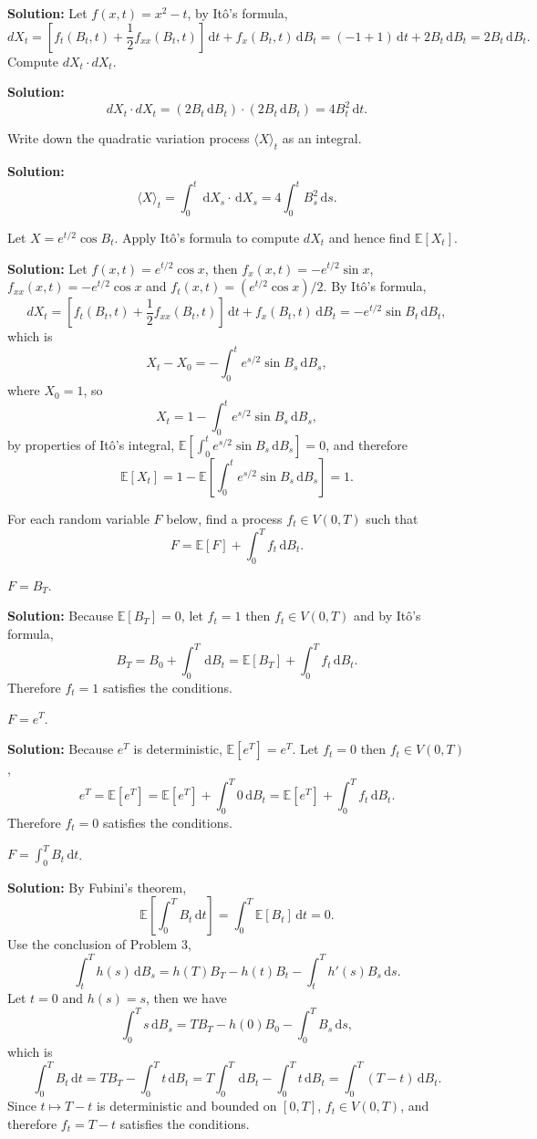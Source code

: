 \documentclass{MFM-hw} %
\newcommand{\dd}{\,\mathrm{d}}
\newcommand{\EE}{\mathbb{E}}
\newcommand{\Ito}{It\^{o}}
\begin{document}
\textbf{Solution: }Let $f(x,t) = x^2 - t$, by \Ito's formula,
\[
    dX_t = [f_t(B_t,t) +\frac{1}{2} f_{xx}(B_t, t)] \dd t + f_x(B_t,t)\dd B_t = (-1 + 1) \dd t + 2B_t \dd B_t = 2B_t \dd B_t.
\]
\HWsubproblem
Compute $dX_t \cdot dX_t$.

\textbf{Solution: }
\[
    dX_t \cdot dX_t = (2B_t \dd B_t)\cdot(2B_t \dd B_t) = 4 B_t^2 \dd t.
\]

\HWsubproblem
Write down the quadratic variation process $\langle X\rangle_t$ as an integral.

\textbf{Solution: }
\[
    \langle X\rangle_t = \int_0^{t} \dd X_s \cdot \dd X_s = 4 \int_0^t B_s^2 \dd s.
\]

\HWproblem
Let $X = e^{t/2}\cos B_t$. Apply \Ito's formula to compute $dX_t$ and hence find $\EE[X_t]$.

\textbf{Solution: }Let $f(x, t) = e^{t/2}\cos x$, then $f_x(x, t) = -e^{t/2}\sin x$, $f_{xx}(x,t) = -e^{t/2}\cos x$ and $f_t(x,t) = (e^{t/2}\cos x)/2$. By \Ito's formula,
\[
    dX_t = [f_t(B_t,t) + \frac{1}{2}f_{xx}(B_t,t)]\dd t + f_x(B_t, t)\dd B_t = - e^{t/2}\sin B_t \dd B_t,
\]
which is
\[
    X_t - X_0 = - \int_{0}^{t} e^{s/2}\sin B_s \dd B_s,
\]
where $X_0 = 1$, so
\[
    X_t = 1 - \int_{0}^{t} e^{s/2}\sin B_s \dd B_s,
\]
by properties of \Ito's integral, $\EE[\int_{0}^{t} e^{s/2}\sin B_s \dd B_s] = 0$, and therefore
\[
    \EE[X_t] = 1 - \EE[\int_{0}^{t} e^{s/2}\sin B_s \dd B_s] = 1.
\]

\HWproblem
For each random variable $F$ below, find a process $f_t \in V(0,T)$ such that
\[
    F = \EE[F] + \int_{0}^{T} f_t \dd B_t.
\]

\HWsubproblem
$F = B_T$.

\textbf{Solution: }Because $\EE[B_T] = 0$, let $f_t = 1$ then $f_t \in V(0,T)$ and by \Ito's formula,
\[
    B_T  = B_0 + \int_{0}^T \dd B_t = \EE[B_T] + \int_0^{T} f_t \dd B_t.
\]
Therefore $f_t = 1$ satisfies the conditions.

\HWsubproblem
$F = e^T$.

\textbf{Solution: }Because $e^T$ is deterministic, $\EE[e^T] = e^T$. Let $f_t = 0$ then $f_t \in V(0,T)$,
\[
    e^T  = \EE[e^T] = \EE[e^T] + \int_0^{T}0\dd B_t = \EE[e^T] + \int_0^{T} f_t\dd B_t.
\]
Therefore $f_t = 0$ satisfies the conditions.

\HWsubproblem
$F = \int_0^{T} B_t \dd t$.

\textbf{Solution: }By Fubini's theorem,
\[
    \EE [\int_0^{T} B_t \dd t] = \int_0^T\EE[B_t]\dd t = 0.
\]
Use the conclusion of Problem 3,
\[
    \int_{t}^{T} h(s) \dd B_s = h(T)B_T - h(t)B_t - \int_{t}^{T} h'(s) B_s \dd s.
\]
Let $t = 0$ and $h(s) = s$, then we have
\[
    \int_{0}^{T} s \dd B_s = TB_T - h(0)B_0 - \int_{0}^{T} B_s \dd s,
\]
which is
\[
    \int_{0}^{T} B_t \dd t = TB_T - \int_{0}^{T} t \dd B_t = T\int_{0}^{T} \dd B_t - \int_{0}^{T} t \dd B_t = \int_0^{T}(T-t)\dd B_t.
\]
Since $t \mapsto T-t$ is deterministic and bounded on $[0,T]$, $f_t \in V(0,T)$, and therefore $f_t = T-t$ satisfies the conditions.
\end{document}
